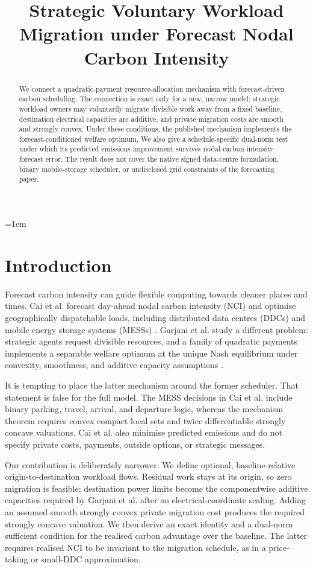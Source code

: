\documentclass{article}
\title{Strategic Voluntary Workload Migration under Forecast Nodal Carbon Intensity}
\author{}
\date{}
\begin{document}
\emergencystretch=1em
\maketitle

\begin{abstract}
We connect a quadratic-payment resource-allocation mechanism with forecast-driven carbon scheduling. The connection is exact only for a new, narrow model: strategic workload owners may voluntarily migrate divisible work away from a fixed baseline, destination electrical capacities are additive, and private migration costs are smooth and strongly convex. Under these conditions, the published mechanism implements the forecast-conditioned welfare optimum. We also give a schedule-specific dual-norm test under which its predicted emissions improvement survives nodal-carbon-intensity forecast error. The result does not cover the native signed data-centre formulation, binary mobile-storage scheduler, or undisclosed grid constraints of the forecasting paper.
\end{abstract}

\section{Introduction}

Forecast carbon intensity can guide flexible computing towards cleaner places and times. Cai et al. forecast day-ahead nodal carbon intensity (NCI) and optimise geographically dispatchable loads, including distributed data centres (DDCs) and mobile energy storage systems (MESSs) \cite{cai2026}. Garjani et al. study a different problem: strategic agents request divisible resources, and a family of quadratic payments implements a separable welfare optimum at the unique Nash equilibrium under convexity, smoothness, and additive capacity assumptions \cite{garjani2026}.

It is tempting to place the latter mechanism around the former scheduler. That statement is false for the full model. The MESS decisions in Cai et al. include binary parking, travel, arrival, and departure logic, whereas the mechanism theorem requires convex compact local sets and twice differentiable strongly concave valuations. Cai et al. also minimise predicted emissions and do not specify private costs, payments, outside options, or strategic messages.

Our contribution is deliberately narrower. We define optional, baseline-relative origin-to-destination workload flows. Residual work stays at its origin, so zero migration is feasible; destination power limits become the componentwise additive capacities required by Garjani et al. after an electrical-coordinate scaling. Adding an assumed smooth strongly convex private migration cost produces the required strongly concave valuation. We then derive an exact identity and a dual-norm sufficient condition for the realised carbon advantage over the baseline. The latter requires realised NCI to be invariant to the migration schedule, as in a price-taking or small-DDC approximation.
\end{document}
